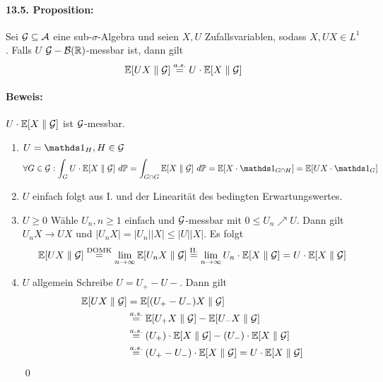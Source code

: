      \paragraph{13.5. Proposition:}Sei $\mathcal{G}\subseteq\mathcal{A}$ eine sub-$\sigma$-Algebra und seien $X,U$ Zufallsvariablen, sodass $X,UX\in L^1$. Falls $U$ $\mathcal{G}-\mathcal{B}(\mathbb{R})$-messbar ist, dann gilt
     $$\mathbb{E}[UX\parallel\mathcal{G}]\overset{a.s.}{=}U\cdot\mathbb{E}[X\parallel\mathcal{G}]$$
     
     \paragraph{Beweis:}$U\cdot\mathbb{E}[X\parallel\mathcal{G}]$ ist $\mathcal{G}$-messbar.
     \begin{enumerate}[label=\Roman*.]
         \item $U=\ind{H},H\in\G$\newline
         $$\forall G\in\G:\int_GU\cdot\E[X\parallel\G]\ d\Pp=\int_{G\cap G}\E[X\parallel\G]\ d\Pp=\E[X\cdot\ind{G\cap H}]=\E[UX\cdot\ind{G}]$$
         \item $U$ einfach\newline
         folgt aus I. und der Linearit\"at des bedingten Erwartungswertes.
         \item $U\geq0$\newline
         W\"ahle $U_n,n\geq1$ einfach und $\mathcal{G}$-messbar mit $0\leq U_n\nearrow U$. Dann gilt $U_nX\to UX$ und $|U_nX|=|U_n||X|\leq|U||X|$. Es folgt
         \begin{align*}
             \mathbb{E}[UX\parallel\mathcal{G}]\overset{\text{DOMK}}{=}\lim_{n\to\infty}\mathbb{E}[U_n X\parallel{\mathcal{G}}]\overset{\text{II.}}{=}\lim_{n\to\infty}U_n\cdot\mathbb{E}[X\parallel\mathcal{G}]=U\cdot\mathbb{E}[X\parallel\mathcal{G}]
         \end{align*}
         \item $U$ allgemein\newline
         Schreibe $U=U_+-U-$. Dann gilt
         \begin{align*}
             \mathbb{E}[UX\parallel\mathcal{G}]&=\mathbb{E}[(U_+-U_-)X\parallel\mathcal{G}]\\
             &\overset{a.s.}{=}\mathbb{E}[U_+X\parallel\mathcal{G}]-\mathbb{E}[U_-X\parallel\mathcal{G}]\\
             &\overset{a.s.}{=}(U_+)\cdot\mathbb{E}[X\parallel\mathcal{G}]-(U_-)\cdot\mathbb{E}[X\parallel\mathcal{G}]\\
             &\overset{a.s.}{=}(U_+-U_-)\cdot\mathbb{E}[X\parallel\mathcal{G}]=U\cdot\mathbb{E}[X\parallel\mathcal{G}]
         \end{align*}
         \qed
     \end{enumerate}
     
